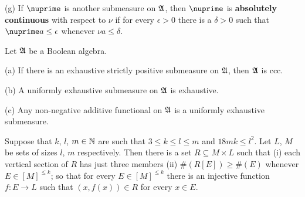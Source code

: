 (g) If $\nuprime$ is another submeasure on $\frak A$, then $\nuprime$ is
{\bf absolutely continuous} with respect to $\nu$ if for every
$\epsilon>0$ there is a
$\delta>0$ such that $\nuprime a\le\epsilon$ whenever $\nu a\le\delta$.

 Let $\frak A$ be a Boolean algebra.

(a) If there is an exhaustive strictly positive submeasure on $\frak A$,
then $\frak A$ is ccc.

(b) A uniformly exhaustive submeasure on $\frak A$ is exhaustive.

(c) Any non-negative additive functional on $\frak A$ is a uniformly
exhaustive submeasure.


 Suppose that $k$, $l$, $m\in\Bbb N$ are such that
$3\le k\le l\le m$ and $18mk\le l^2$.   Let $L$, $M$ be sets of sizes
$l$, $m$
respectively.   Then there is a set $R\subseteq M\times L$ such that (i)
each vertical section of $R$ has just three members (ii)
$\#(R[E])\ge\#(E)$ whenever $E\in[M]^{\le k}$;  so that for every
$E\in[M]^{\le k}$ there is an injective function $f:E\to L$ such that
$(x,f(x))\in R$ for every $x\in E$.


